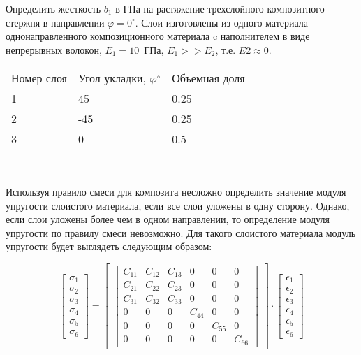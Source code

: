 

Определить жесткость $b_1$ в ГПа на растяжение трехслойного композитного стержня в направлении $\varphi = 0^{\circ}$.
Слои изготовлены из одного материала – однонаправленного композиционного материала c наполнителем в 
виде непрерывных волокон, $E_1=10$~ГПа, $E_1>>E_2$, т.е. $E2 \approx 0$.

\begin{tabular}{l l l}
    Номер слоя & Угол укладки, $\varphi^{\circ}$ & Объемная доля \\
    1 & 45 & 0.25 \\
    2 & -45 & 0.25 \\
    3 &  0  & 0.5
\end{tabular}\\

\explanationSection

Используя правило смеси для композита несложно определить 
значение модуля упругости слоистого материала, если все слои 
уложены в одну сторону. Однако, если слои уложены более чем в 
одном направлении, то определение модуля упругости по правилу 
смеси невозможно. Для такого слоистого материала модуль 
упругости будет выглядеть следующим образом:

$$\begin{bmatrix}
    \sigma_1\\
    \sigma_2\\
    \sigma_3\\
    \sigma_4\\
    \sigma_5\\
    \sigma_6
\end{bmatrix}
=
\begin{bmatrix}
    \begin{bmatrix}
        C_{11} & C_{12} & C_{13} & 0 & 0 & 0 \\
        C_{21} & C_{22} & C_{23} & 0 & 0 & 0 \\
        C_{31} & C_{32} & C_{33} & 0 & 0 & 0 \\
        0 & 0 & 0 & C_{44} & 0 & 0\\
        0 & 0 & 0 & 0 & C_{55} & 0\\
        0 & 0 & 0 & 0 & 0 & C_{66}
    \end{bmatrix}
\end{bmatrix}
\cdot
\begin{bmatrix}
    \epsilon_1\\
    \epsilon_2\\
    \epsilon_3\\
    \epsilon_4\\
    \epsilon_5\\
    \epsilon_6
\end{bmatrix}
$$

